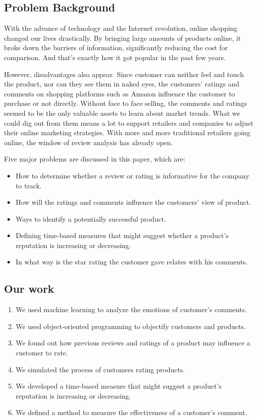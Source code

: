 \documentclass[12pt]{article}  %
\begin{document}
\subsection{Problem Background}
With the advance of technology and the Internet revolution, online shopping changed our lives drastically. By bringing large amounts of products online, it broke down the barriers of information, significantly reducing the cost for comparison. And that’s exactly how it got popular in the past few years.

However, disadvantages also appear.  Since customer can neither feel and touch the product, nor can they see them in naked eyes, the customers' ratings and comments on shopping platforms such as Amazon influence the customer to purchase or not directly. Without face to face selling, the comments and ratings seemed to be the only valuable assets to learn about market trends. What we could dig out from them means a lot to support retailers and companies to adjust their online marketing strategies. With more and more traditional retailers going online, the window of review analysis has already open.
\newline

\noindent
Five major problems are discussed in this paper, which are:
\begin{itemize}
    \item How to determine whether a review or rating is informative for the company to track.
    \item How will the ratings and comments influence the customers' view of product.
    \item Ways to identify a potentially successful product.
    \item Defining time-based measures that might suggest whether a product's reputation is increasing or decreasing.
    \item In what way is the star rating the customer gave relates with his comments.
      
      
\end{itemize}


\subsection{Our work}
\begin{enumerate}[\bfseries 1.]
    \item We used machine learning to analyze the emotions of customer's comments.
    \item We used object-oriented programming to objectify customers and products.
      \item We found out how previous reviews and ratings of a product may influence a customer to rate.
    \item We simulated the process of customers rating products.
    \item We developed a time-based measure that might suggest a product's reputation is increasing or decreasing.
      \item We defined a method to measure the effectiveness of a customer's comment.
\end{enumerate}
\end{document}
